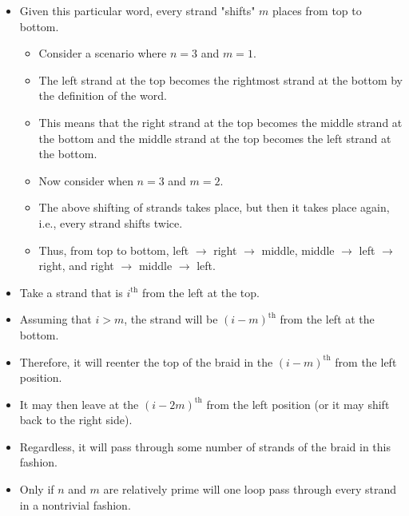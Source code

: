 \documentclass[titlepage]{article}
\numberwithin{figure}{section}
\numberwithin{table}{section}
\numberwithin{equation}{section}
\begin{document}
\begin{itemize}
    \begin{itemize}
        \item Given this particular word, every strand "shifts" $m$ places from top to bottom.
        \begin{itemize}
            \item Consider a scenario where $n=3$ and $m=1$.
            \item The left strand at the top becomes the rightmost strand at the bottom by the definition of the word.
            \item This means that the right strand at the top becomes the middle strand at the bottom and the middle strand at the top becomes the left strand at the bottom.
            \item Now consider when $n=3$ and $m=2$.
            \item The above shifting of strands takes place, but then it takes place again, i.e., every strand shifts twice.
            \item Thus, from top to bottom, left $\rightarrow$ right $\rightarrow$ middle, middle $\rightarrow$ left $\rightarrow$ right, and right $\rightarrow$ middle $\rightarrow$ left.
        \end{itemize}
        \item Take a strand that is $i^\text{th}$ from the left at the top.
        \item Assuming that $i>m$, the strand will be $(i-m)^\text{th}$ from the left at the bottom.
        \item Therefore, it will reenter the top of the braid in the $(i-m)^\text{th}$ from the left position.
        \item It may then leave at the $(i-2m)^\text{th}$ from the left position (or it may shift back to the right side).
        \item Regardless, it will pass through some number of strands of the braid in this fashion.
        \item Only if $n$ and $m$ are relatively prime will one loop pass through every strand in a nontrivial fashion.

\end{itemize}
\end{itemize}
\end{document}
